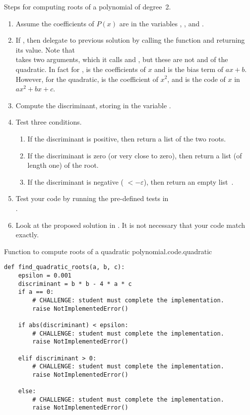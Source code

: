 Steps for computing roots of a polynomial of degree~2.
\begin{enumerate}
\item Assume the coefficients of $P(x)$ are in the variables ,
  , and .
\item If , then delegate to previous solution by calling
  the function  and returning its value.
  Note that \\  takes two arguments, which it
  calls  and , but these are not  and 
  of the quadratic.  In fact for , 
  is the coefficients of $x$ and  is the bias term of $a x +
  b$.  However, for the quadratic,  is the coefficient of
  $x^2$, and  is the code of $x$ in $a x^2 + b x + c$.
\item Compute the discriminant, storing in the variable
  .
\item Test three conditions.
  \begin{enumerate}
  \item If the discriminant is positive, then return a list of the two
    roots.
  \item If the discriminant is zero (or very close to zero), then
    return a list (of length one) of the root.
  \item If the discriminant is negative ( $< -\varepsilon$), then
    return an empty list~\code{[]}.
  \end{enumerate}

\item Test your code by running the pre-defined tests in
  \\ .

\item Look at the proposed solution in .
  It is not necessary that your code match exactly.


\end{enumerate}


\begin{listing}{Function to compute roots of a quadratic polynomial.}{code.quadratic}
\begin{minipage}[c]{0.95\textwidth}\begin{lstlisting}
def find_quadratic_roots(a, b, c):
    epsilon = 0.001
    discriminant = b * b - 4 * a * c
    if a == 0:
        # CHALLENGE: student must complete the implementation.
        raise NotImplementedError()

    if abs(discriminant) < epsilon:
        # CHALLENGE: student must complete the implementation.
        raise NotImplementedError()

    elif discriminant > 0:
        # CHALLENGE: student must complete the implementation.
        raise NotImplementedError()

    else:
        # CHALLENGE: student must complete the implementation.
        raise NotImplementedError()

\end{lstlisting}\end{minipage}\end{listing}


